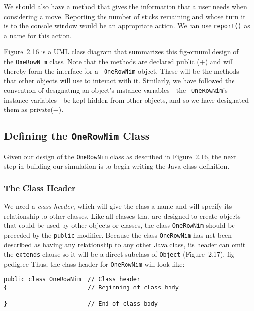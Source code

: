 We should also have a method that gives the information that a user
needs when considering a move. Reporting the number of sticks
remaining and whose turn it is to the console window would be an
appropriate action.  We can use {\tt report()} as a name for this
action.

Figure~2.16 is a UML class diagram that summarizes this
{fig-ornuml}
design of the {\tt OneRowNim} class.  Note that the methods are
declared public ($+$) and will thereby form the interface for a {\tt
OneRowNim} object. These will be the methods that other objects will
use to interact with it.  Similarly, we have followed the convention
of designating an object's instance variables---the \mbox{\tt
OneRowNim}'s instance variables---be kept hidden from other objects,
and so we have designated them as private($-$).

\subsection{Defining the {\tt OneRowNim} Class}

\noindent Given our design of the {\tt OneRowNim} class
as described in Figure~2.16, the next step in building our
simulation is to begin writing the Java class definition.

\subsubsection*{The Class Header}

\noindent We need a {\it class header}, which will give the class a name
and will specify its relationship to other classes.  Like all classes
that are designed to create objects that could be used by other
objects or classes, the class {\tt OneRowNim} should be preceded by
the {\tt public} modifier.  Because the class {\tt OneRowNim} has not
been described as having any relationship to any other Java class, its
header can omit the {\tt extends} clause so it will be a direct
subclass of {\tt Object} (Figure~2.17).
{fig-pedigree}
Thus, the class header for {\tt OneRowNim} will look like:

\begin{jjjlisting}
\begin{lstlisting}
public class OneRowNim  // Class header
{                       // Beginning of class body

}                       // End of class body
\end{lstlisting}
\end{jjjlisting}

